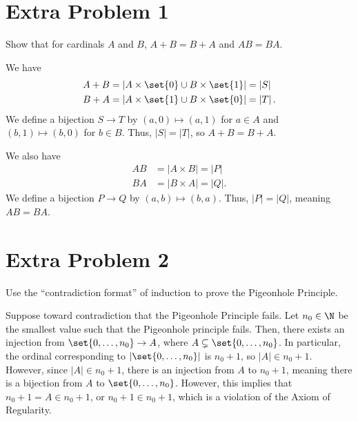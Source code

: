 \documentclass[10pt]{mypackage}
\begin{document}
\section{Extra Problem 1}%
\begin{problem}
  Show that for cardinals $A$ and $B$, $A+B = B+A$ and $AB = BA$.
\end{problem}
\begin{solution}
  We have
  \begin{align*}
    A+B &= \left\vert A\times \set{0} \cup B\times \set{1} \right\vert = \left\vert S \right\vert\\
    B+A &= \left\vert A\times \set{1} \cup B\times \set{0} \right\vert = \left\vert T \right\vert.
  \end{align*}
  We define a bijection $S\rightarrow T$ by $ \left(a,0\right)\mapsto\left(a,1\right)$ for $a\in A$ and $\left(b,1\right)\mapsto \left(b,0\right)$ for $b\in B$. Thus, $\left\vert S \right\vert = \left\vert T \right\vert$, so $A+B = B+A$.\newline

  We also have
  \begin{align*}
    AB &= \left\vert A\times B \right\vert = \left\vert P \right\vert\\
    BA &= \left\vert B\times A \right\vert = \left\vert Q \right\vert.
  \end{align*}
    We define a bijection $P\rightarrow Q$ by $(a,b)\mapsto (b,a)$. Thus, $\left\vert P \right\vert = \left\vert Q \right\vert$, meaning $AB = BA$.
\end{solution}
\section{Extra Problem 2}%
\begin{problem}
  Use the ``contradiction format'' of induction to prove the Pigeonhole Principle.
\end{problem}
\begin{solution}
  Suppose toward contradiction that the Pigeonhole Principle fails. Let $n_0\in \N$ be the smallest value such that the Pigeonhole principle fails. Then, there exists an injection from $\set{0,\dots,n_0}\rightarrow A$, where $A\subsetneq \set{0,\dots,n_0}$. In particular, the ordinal corresponding to $\left\vert \set{0,\dots,n_0} \right\vert $ is $ n_0 + 1$, so $\left\vert A \right\vert\in n_0 + 1$. However, since $\left\vert A \right\vert\in n_0 + 1$, there is an injection from $A$ to $n_0 + 1$, meaning there is a bijection from $A$ to $\set{0,\dots,n_0}$. However, this implies that $n_0 + 1 = A \in n_0 + 1$, or $n_0 + 1\in n_0 + 1$, which is a violation of the Axiom of Regularity.
\end{solution}
\end{document}
